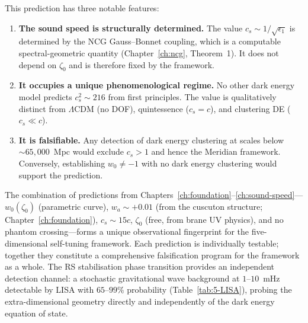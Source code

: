 This prediction has three notable features:

\begin{enumerate}
\item \textbf{The sound speed is structurally determined.} The value $c_s \sim 1/\sqrt{\epsilon_1}$ is determined by the NCG Gauss--Bonnet coupling, which is a computable spectral-geometric quantity (Chapter~\ref{ch:ncg}, Theorem~1). It does not depend on $\zeta_0$ and is therefore fixed by the framework.

\item \textbf{It occupies a unique phenomenological regime.} No other dark energy model predicts $c_s^2 \sim 216$ from first principles. The value is qualitatively distinct from $\Lambda$CDM (no DOF), quintessence ($c_s = c$), and clustering DE ($c_s \ll c$).

\item \textbf{It is falsifiable.} Any detection of dark energy clustering at scales below ${\sim}65{,}000$~Mpc would exclude $c_s > 1$ and hence the Meridian framework. Conversely, establishing $w_0 \neq -1$ with no dark energy clustering would support the prediction.
\end{enumerate}

The combination of predictions from Chapters~\ref{ch:foundation}--\ref{ch:sound-speed}---$w_0(\zeta_0)$ (parametric curve), $w_a \sim +0.01$ (from the cuscuton structure; Chapter~\ref{ch:foundation}), $c_s \sim 15c$, $\zeta_0$ (free, from brane UV physics), and no phantom crossing---forms a unique observational fingerprint for the five-dimensional self-tuning framework. Each prediction is individually testable; together they constitute a comprehensive falsification program for the framework as a whole. The RS stabilisation phase transition provides an independent detection channel: a stochastic gravitational wave background at $1$--$10$~mHz detectable by LISA with $65$--$99\%$ probability (Table~\ref{tab:5-LISA}), probing the extra-dimensional geometry directly and independently of the dark energy equation of state.

